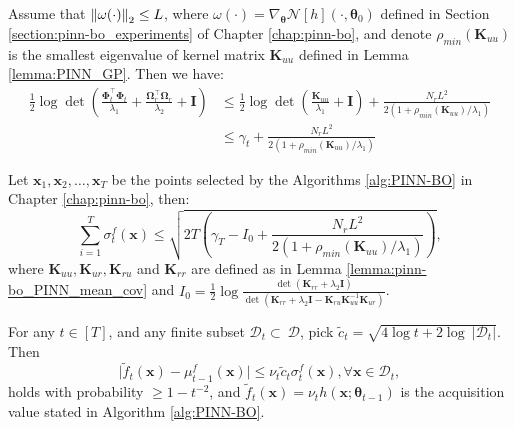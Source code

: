 \begin{auxlemma}
\label{lemma:pinn-bo_IG_with_pde_upper_bound}
    Assume that $\norm{\omega(\cdot)}_2 \le L$, where $\omega(\cdot)  = \nabla_{\boldsymbol{\theta}} \mathcal{N}[h] (\cdot, \boldsymbol{\theta}_0)$ defined in Section \ref{section:pinn-bo_experiments} of Chapter \ref{chap:pinn-bo}, and denote $\rho_{min}(\mathbf{K}_{uu})$ is the smallest eigenvalue of kernel matrix $\mathbf{K}_{uu}$ defined in Lemma \ref{lemma:PINN_GP}. Then we have:
\begin{align*}
    \frac{1}{2}\log \det(\frac{\boldsymbol{\Phi}_t^\top \boldsymbol{\Phi}_t}{\lambda_1} + \frac{\boldsymbol{\Omega}_r^\top \boldsymbol{\Omega}_r}{\lambda_2} + \mathbf{I}) & \le  \frac{1}{2}\log\det (\frac{\mathbf{K}_{uu}}{\lambda_1} +\mathbf{I})+\frac{N_r L^2}{2(1+ \rho_{min}(\mathbf{K}_{uu})/\lambda_1)}
    \\
    & \le \gamma_t +  \frac{N_r  L^2}{2(1+ \rho_{min}(\mathbf{K}_{uu})/\lambda_1)}
\end{align*}
\end{auxlemma}

\begin{auxlemma}
\label{lemma:pinn-bo_var_sum_bound}
    Let $\mathbf{x}_1, \mathbf{x}_2,\dots, \mathbf{x}_T$ be the points selected by the Algorithms \ref{alg:PINN-BO} in Chapter \ref{chap:pinn-bo}, then:
    \[\sum_{i=1}^T \sigma_t^f(\mathbf{x}) \le \sqrt{2T \left(\gamma_T - I_0 + \frac{N_r L^2}{2(1+ \rho_{min}(\mathbf{K}_{uu})/\lambda_1)}\right)}, \]
    where $\mathbf{K}_{uu}, \mathbf{K}_{ur}, \mathbf{K}_{ru}$ and $\mathbf{K}_{rr}$ are defined as in Lemma \ref{lemma:pinn-bo_PINN_mean_cov} and $I_0 =\frac{1}{2}\log \frac{\det(\mathbf{K}_{rr} + \lambda_2\mathbf{I})}{\det(\mathbf{K}_{rr} + \lambda_2\mathbf{I} - \mathbf{K}_{ru} \mathbf{K}_{uu}^{-1} \mathbf{K}_{ur})}$.
\end{auxlemma}

\begin{auxlemma}
\label{lemma:pinn-bo_sampling_bound}
For any $t \in [T]$, and any finite subset $\mathcal{D}_t \subset\ \mathcal{D}$,  pick $\widetilde{c}_t =  \sqrt{4\log t + 2 \log \ \lvert \mathcal D_t \rvert}$. Then  
\[\lvert \widetilde{f}_t(\mathbf{x}) - \mu_{t-1}^f(\mathbf{x}) \rvert \leq \nu_t \widetilde{c}_t \sigma_t^f(\mathbf{x}), \forall \mathbf{x} \in \mathcal{D}_t, \] 
holds with probability $\geq  1-t^{-2}$, and $\widetilde{f}_t(\mathbf{x}) = \nu_t h(\mathbf{x}; \boldsymbol{\theta}_{t-1})$ is the acquisition value stated in Algorithm \ref{alg:PINN-BO}.   
\end{auxlemma}

